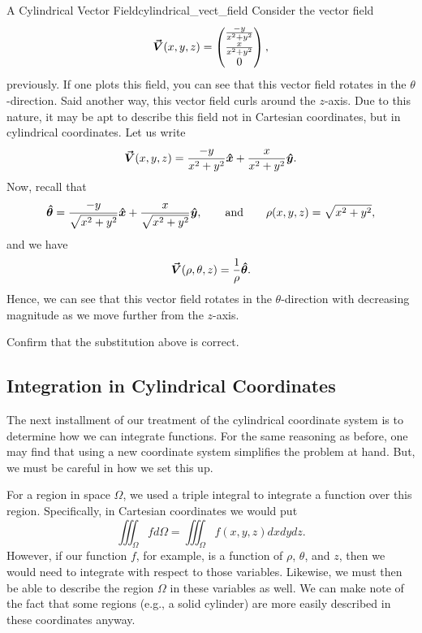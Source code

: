 \begin{ex}{A Cylindrical Vector Field}{cylindrical_vect_field}
    Consider the vector field
    \[
    \boldsymbol{\vec{V}}(x,y,z) = \begin{pmatrix} \frac{-y}{x^2+y^2} \\ \frac{x}{x^2+y^2} \\ 0 \end{pmatrix},
    \]
    previously.  If one plots this field, you can see that this vector field rotates in the $\theta$-direction. Said another way, this vector field curls around the $z$-axis.  Due to this nature, it may be apt to describe this field not in Cartesian coordinates, but in cylindrical coordinates.  Let us write
    \[
    \boldsymbol{\vec{V}}(x,y,z) = \frac{-y}{x^2+y^2}\boldsymbol{\hat{x}} + \frac{x}{x^2+y^2}\boldsymbol{\hat{y}}.
    \]
    Now, recall that
    \[
    \boldsymbol{\hat{\theta}} = \frac{-y}{\sqrt{x^2+y^2}}\boldsymbol{\hat{x}} + \frac{x}{\sqrt{x^2+y^2}}\boldsymbol{\hat{y}}, \qquad \textrm{and} \qquad \rho(x,y,z) = \sqrt{x^2+y^2},
    \]
    and we have
    \[
    \boldsymbol{\vec{V}}(\rho,\theta,z) = \frac{1}{\rho} \boldsymbol{\hat{\theta}}.
    \]
    Hence, we can see that this vector field rotates in the $\theta$-direction with decreasing magnitude as we move further from the $z$-axis.
\end{ex}

\begin{exercise}
    Confirm that the substitution above is correct.
\end{exercise}

\subsection{Integration in Cylindrical Coordinates}

The next installment of our treatment of the cylindrical coordinate system is to determine how we can integrate functions.  For the same reasoning as before, one may find that using a new coordinate system simplifies the problem at hand.  But, we must be careful in how we set this up.

For a region in space $\Omega$, we used a triple integral to integrate a function over this region.  Specifically, in Cartesian coordinates we would put
\[
\iiint_\Omega f d\Omega = \iiint_\Omega f(x,y,z) dxdydz.
\]
However, if our function $f$, for example, is a function of $\rho$, $\theta$, and $z$, then we would need to integrate with respect to those variables.  Likewise, we must then be able to describe the region $\Omega$ in these variables as well.  We can make note of the fact that some regions (e.g., a solid cylinder) are more easily described in these coordinates anyway.


